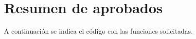 \section{Resumen de aprobados}

  A continuación se indica el código con las funciones
  solicitadas. 
  
    